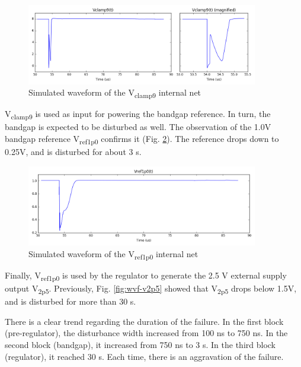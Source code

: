 \begin{figure}[!htbp]
  \centering
  \includegraphics[width=0.9\textwidth]{src/3/figures/vclamp9.png}
  \caption{Simulated waveform of the V\textsubscript{clamp9} internal net}
  \label{fig:wvf-vclamp9}
\end{figure}

V\textsubscript{clamp9} is used as input for powering the bandgap reference.
In turn, the bandgap is expected to be disturbed as well.
The observation of the 1.0V bandgap reference V\textsubscript{ref1p0} confirms it (Fig. \ref{fig:wvf-v1p0}).
The reference drops down to 0.25V, and is disturbed for about 3 \textmugreek{}s.

\begin{figure}[!htbp]
  \centering
  \includegraphics[width=0.9\textwidth]{src/3/figures/v1p0.png}
  \caption{Simulated waveform of the V\textsubscript{ref1p0} internal net}
  \label{fig:wvf-v1p0}
\end{figure}

Finally, V\textsubscript{ref1p0} is used by the regulator to generate the 2.5 V external supply output V\textsubscript{2p5}.
Previously,  Fig. \ref{fig:wvf-v2p5} showed that V\textsubscript{2p5} drops below 1.5V, and is disturbed for more than 30 \textmugreek{}s.

There is a clear trend regarding the duration of the failure.
In the first block (pre-regulator), the disturbance width increased from 100 ns to 750 ns.
In the second block (bandgap), it increased from 750 ns to 3 \textmugreek{}s.
In the third block (regulator), it reached 30 \textmugreek{}s.
Each time, there is an aggravation of the failure.

